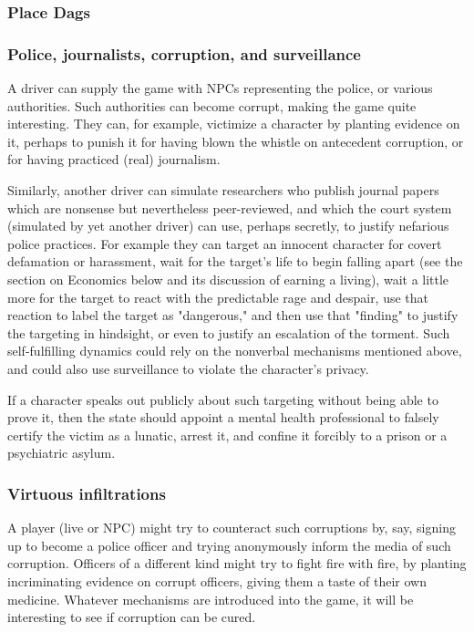 \subsubsection{Place Dags}
\label{sec:future:play:PlaceDags}



\subsubsection{Police, journalists, corruption, and surveillance}

A driver can supply the game with NPCs representing
the police, or various authorities.
Such authorities can become corrupt, making the game quite interesting.
They can, for example, victimize a character by planting evidence on it,
perhaps to punish it for having blown the whistle on antecedent corruption,
or for having practiced (real) journalism.

Similarly, another driver can simulate researchers who publish journal papers
which are nonsense but nevertheless peer-reviewed, and which the court system
(simulated by yet another driver) can use, perhaps secretly, to justify
nefarious police practices.
For example they can target
an innocent character for covert defamation or harassment, wait for
the target's life to begin falling apart (see the section on Economics below
and its discussion of earning a living), wait a little more for the target to
react with the predictable rage and despair, use that reaction to label the
target as "dangerous," and then use that "finding" to justify the targeting
in hindsight, or even to justify an escalation of the torment.
Such self-fulfilling dynamics could
rely on the nonverbal mechanisms mentioned above, and could also use
surveillance to violate the character's privacy.

If a character speaks out publicly about such targeting without being able to
prove it, then the state should appoint a mental health professional to falsely
certify the victim as a lunatic, arrest it, and confine it forcibly to a prison
or a psychiatric asylum.

\subsubsection{Virtuous infiltrations}

A player (live or NPC) might try to counteract such corruptions by, say,
signing up to become a police officer and trying anonymously inform the media
of such corruption.
Officers of a different kind might try to fight fire with fire,
by planting incriminating evidence on corrupt officers, giving them a taste
of their own medicine.
Whatever mechanisms are introduced into the game,
it will be interesting to see if corruption can be cured.

